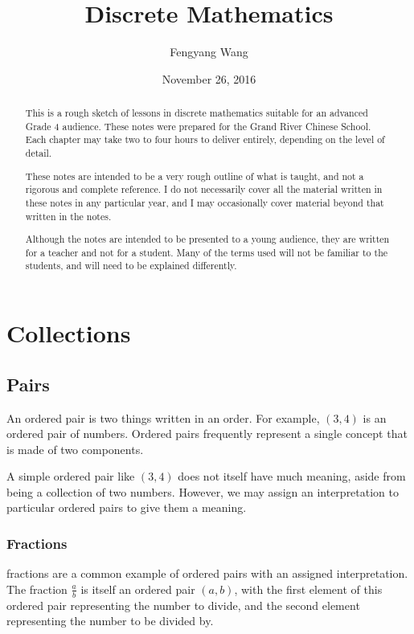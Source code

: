 \documentclass[a4paper,10pt]{report}
\title{Discrete Mathematics}
\author{Fengyang Wang}
\date{November 26, 2016}
\begin{document}
\begin{abstract}

This is a rough sketch of lessons in discrete mathematics suitable for an
advanced Grade 4 audience. These notes were prepared for the Grand River
Chinese School. Each chapter may take two to four hours to deliver entirely,
depending on the level of detail.

These notes are intended to be a very rough outline of what is taught, and not
a rigorous and complete reference. I do not necessarily cover all the material
written in these notes in any particular year, and I may occasionally cover
material beyond that written in the notes.

Although the notes are intended to be presented to a young audience, they are
written for a teacher and not for a student. Many of the terms used will not be
familiar to the students, and will need to be explained differently.

\end{abstract}

\maketitle

\tableofcontents

\chapter{Collections}

\section{Pairs}

An \gls{ordered pair} is two things written in an order. For example, \((3,
4)\) is an ordered pair of numbers. Ordered pairs frequently represent a single
concept that is made of two components.

A simple ordered pair like \((3, 4)\) does not itself have much meaning, aside
from being a collection of two numbers. However, we may assign an
interpretation to particular ordered pairs to give them a meaning.

\subsection{Fractions}

\Glspl{fraction} are a common example of ordered pairs with an assigned
interpretation. The fraction \(\frac{a}{b}\) is itself an ordered pair \((a,
b)\), with the first element of this ordered pair representing the number to
divide, and the second element representing the number to be divided by.
\end{document}
